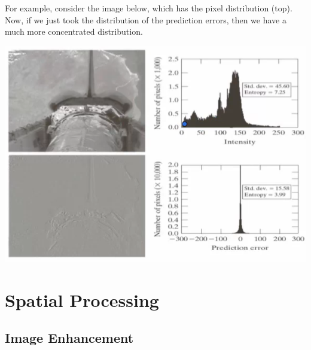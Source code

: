 \documentclass{article}
\begin{document}
    For example, consider the image below, which has the pixel distribution (top). Now, if we just took the distribution of the prediction errors, then we have a much more concentrated distribution. 
    \begin{center}
        \includegraphics[scale=0.4]{img/predictive_encoding.png}
    \end{center}

\section{Spatial Processing}

  \subsection{Image Enhancement}
\end{document}
